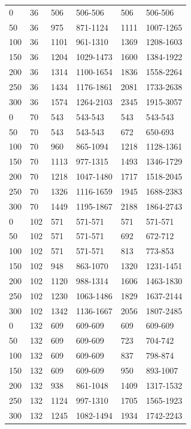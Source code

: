 \begin{table}[H]
{\begin{tabular}{@{\extracolsep{2 pt}}llllll@{}}
			\hline
			0 & 36 & 506 & 506-506 & 506 & 506-506 \\ 
			50 & 36 & 975 & 871-1124 & 1111 & 1007-1265 \\ 
			100 & 36 & 1101 & 961-1310 & 1369 & 1208-1603 \\ 
			150 & 36 & 1204 & 1029-1473 & 1600 & 1384-1922 \\ 
			200 & 36 & 1314 & 1100-1654 & 1836 & 1558-2264 \\ 
			250 & 36 & 1434 & 1176-1861 & 2081 & 1733-2638 \\ 
			300 & 36 & 1574 & 1264-2103 & 2345 & 1915-3057 \\ 
			\hline
			0 & 70 & 543 & 543-543 & 543 & 543-543 \\ 
			50 & 70 & 543 & 543-543 & 672 & 650-693 \\ 
			100 & 70 & 960 & 865-1094 & 1218 & 1128-1361 \\ 
			150 & 70 & 1113 & 977-1315 & 1493 & 1346-1729 \\ 
			200 & 70 & 1218 & 1047-1480 & 1717 & 1518-2045 \\ 
			250 & 70 & 1326 & 1116-1659 & 1945 & 1688-2383 \\ 
			300 & 70 & 1449 & 1195-1867 & 2188 & 1864-2743 \\ 
			\hline
			0 & 102 & 571 & 571-571 & 571 & 571-571 \\ 
			50 & 102 & 571 & 571-571 & 692 & 672-712 \\ 
			100 & 102 & 571 & 571-571 & 813 & 773-853 \\ 
			150 & 102 & 948 & 863-1070 & 1320 & 1231-1451 \\ 
			200 & 102 & 1120 & 988-1314 & 1606 & 1463-1830 \\ 
			250 & 102 & 1230 & 1063-1486 & 1829 & 1637-2144 \\ 
			300 & 102 & 1342 & 1136-1667 & 2056 & 1807-2485 \\ 
			\hline
			0 & 132 & 609 & 609-609 & 609 & 609-609 \\ 
			50 & 132 & 609 & 609-609 & 723 & 704-742 \\ 
			100 & 132 & 609 & 609-609 & 837 & 798-874 \\ 
			150 & 132 & 609 & 609-609 & 950 & 893-1007 \\ 
			200 & 132 & 938 & 861-1048 & 1409 & 1317-1532 \\ 
			250 & 132 & 1124 & 997-1310 & 1705 & 1565-1923 \\ 
			300 & 132 & 1245 & 1082-1494 & 1934 & 1742-2243 \\ 

\end{tabular}}
\end{table}
